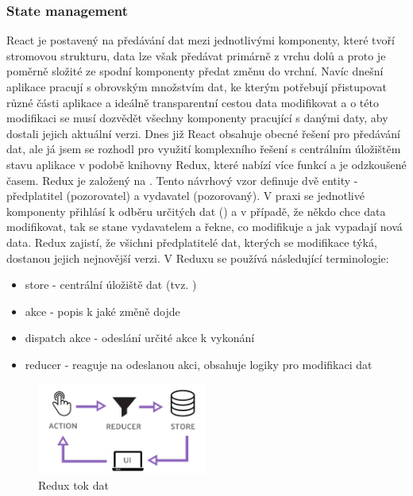 \subsubsection{State management}
React je postavený na předávání dat mezi jednotlivými komponenty, které tvoří stromovou strukturu, data lze však předávat primárně z vrchu dolů a proto je poměrně složité ze spodní komponenty předat změnu do vrchní. Navíc dnešní aplikace pracují s obrovským množstvím dat, ke kterým potřebují přistupovat různé části aplikace a ideálně transparentní cestou data modifikovat a o této modifikaci se musí dozvědět všechny komponenty pracující s danými daty, aby dostali jejich aktuální verzi. Dnes již React obsahuje obecné řešení pro předávání dat, ale já jsem se rozhodl pro využití komplexního řešení s centrálním úložištěm stavu aplikace v podobě knihovny Redux, které nabízí více funkcí a je odzkoušené časem. Redux je založený na . Tento návrhový vzor definuje dvě entity - předplatitel (pozorovatel) a vydavatel (pozorovaný). V praxi se jednotlivé komponenty přihlásí k odběru určitých dat () a v případě, že někdo chce data modifikovat, tak se stane vydavatelem a řekne, co modifikuje a jak vypadají nová data. Redux zajistí, že všichni předplatitelé dat, kterých se modifikace týká, dostanou jejich nejnovější verzi. V Reduxu se používá následující terminologie:
\begin{itemize}
    \item store - centrální úložiště dat (tvz. )
    \item akce - popis k jaké změně dojde
    \item dispatch akce - odeslání určité akce k vykonání
    \item reducer - reaguje na odeslanou akci, obsahuje logiky pro modifikaci dat
\end{itemize}
\begin{figure}[htbp]
    \centering
    \includegraphics[width=0.5\textwidth]{img/redux.png}
    \caption{Redux tok dat \cite{img-redux-flow}}
\end{figure}


